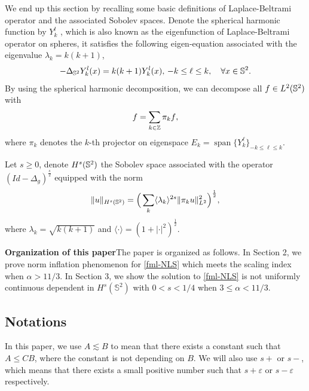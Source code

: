 \documentclass[11pt, reqno]{amsart}
\numberwithin{equation}{section}
\theoremstyle{definition}
\theoremstyle{remark}
\begin{document}
	We end up this section by recalling some basic  definitions of Laplace-Beltrami operator and the associated Sobolev spaces.
	 Denote the spherical harmonic function by $Y_k^l$ , which is also known as the eigenfunction of Laplace-Beltrami operator on spheres, it  satisfies the following eigen-equation associated with the eigenvalue $\lambda_k=k(k+1)$,
\begin{align*}
	-\Delta_{\Bbb{S}^2}Y_{k}^l(x)=k(k+1)Y_{k}^l(x),\,-k\leq \ell\leq k,\quad\forall x\in\Bbb{S}^2.
\end{align*}
By using the spherical harmonic decomposition, we can decompose all $f\in L^2(\Bbb S^2)$ with
\begin{align*}
	f=\sum_{k\in\Bbb{Z}} {\pi_kf},
\end{align*}
where $\pi_k$ denotes the $k$-th projector on eigenspace $E_k=\operatorname{span}\{Y_{k}^\ell\}_{-k\leq\ell\leq k}$.

Let $s\geqslant0$, denote $H^s(\Bbb S^2)$ the Sobolev space associated with the operator $(Id-\Delta_g)^\frac{s}{2}$ equipped with the norm
\begin{align*}
	\Vert u\Vert_{H^s(\Bbb S^2)}=\Big(\sum_{k}\langle\lambda_k\rangle^{2s}\Vert \pi_ku\Vert_{L^2}^2\Big)^\frac{1}{2},
\end{align*}
where $\lambda_k=\sqrt{k(k+1)}$ and $\langle \cdot\rangle=(1+|\cdot|^2)^\frac12$.
	
\textbf{Organization of this paper}\hspace{2ex}The paper is organized as follows. In Section 2, we prove norm inflation phenomenon for \eqref{fml-NLS} which meets the scaling index when $\alpha>11/3$. In Section 3, we show the solution to \eqref{fml-NLS} is not uniformly continuous dependent in $H^s(\mathbb S^2)$ with $0<s<1/4$ when $3\leq\alpha<11/3$.
	
\subsection{Notations}
In this paper, we use $A\lesssim B$ to mean that there exists a constant such that $A\leqslant CB$, where the constant is not depending on $B$. We will also use $s+$ or $s-$, which means that there exists a small positive number such that $s+\varepsilon$ or $s-\varepsilon$ respectively.
	
	
	
	
\end{document}
